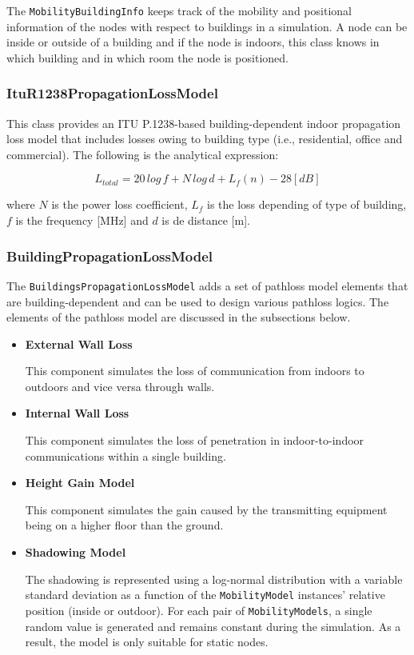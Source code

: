 The \texttt{MobilityBuildingInfo} keeps track of the mobility and positional information of 
the nodes with respect to buildings in a simulation. A node can be inside or outside of
a building and if the node is indoors, this class knows in which building and in which room
the node is positioned.

\subsubsection{ItuR1238PropagationLossModel}

This class provides an ITU P.1238-based building-dependent indoor propagation loss model 
that includes losses owing to building type (i.e., residential, office and commercial). 
The following is the analytical expression:

\begin{equation}
  L_{total} = 20\,log\,f + N\,log\,d + L_f (n) - 28[dB]
\end{equation}

where ${N}$ is the power loss coefficient, ${L_f}$ is the loss depending of type of building,
${f}$ is the frequency [MHz] and ${d}$ is de distance [m].

\subsubsection{BuildingPropagationLossModel}

The \texttt{BuildingsPropagationLossModel} adds a set of pathloss model elements that are 
building-dependent and can be used to design various pathloss logics. The elements of the 
pathloss model are discussed in the subsections below.

\begin{itemize}
  \item \textbf{External Wall Loss}

  This component simulates the loss of communication from indoors to outdoors and vice versa through walls.
  \item \textbf{Internal Wall Loss}

  This component simulates the loss of penetration in indoor-to-indoor communications within a single building.
  \item \textbf{Height Gain Model}

  This component simulates the gain caused by the transmitting equipment being on a higher floor than the ground.
  \item \textbf{Shadowing Model}

  The shadowing is represented using a log-normal distribution with a variable standard deviation
  as a function of the \texttt{MobilityModel} instances' relative position (inside or outdoor). For each 
  pair of \texttt{MobilityModels}, a single random value is generated and remains constant during the 
  simulation. As a result, the model is only suitable for static nodes.
\end{itemize}

